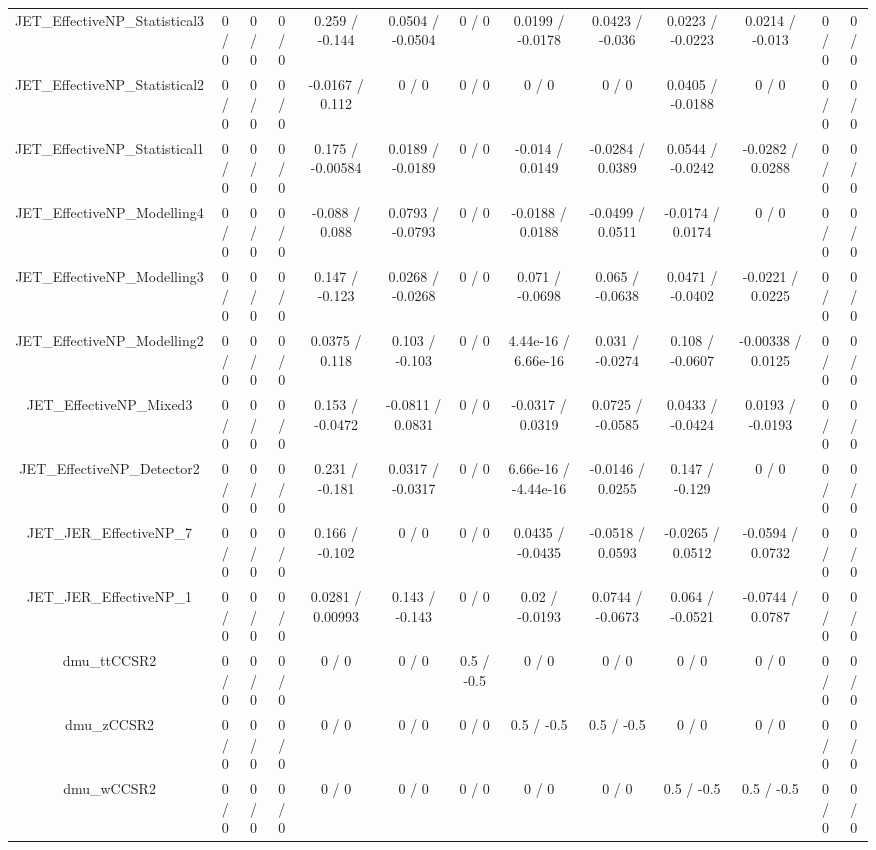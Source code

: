 \documentclass[10pt]{article}
\begin{document}
\begin{table}[htbp]
\begin{center}
\begin{tabular}{|c|c|c|c|c|c|c|c|c|c|c|c|c|}
  JET_EffectiveNP_Statistical3 & 0 / 0 & 0 / 0 & 0 / 0 & 0.259 / -0.144 & 0.0504 / -0.0504 & 0 / 0 & 0.0199 / -0.0178 & 0.0423 / -0.036 & 0.0223 / -0.0223 & 0.0214 / -0.013 & 0 / 0 & 0 / 0 \\ 
  JET_EffectiveNP_Statistical2 & 0 / 0 & 0 / 0 & 0 / 0 & -0.0167 / 0.112 & 0 / 0 & 0 / 0 & 0 / 0 & 0 / 0 & 0.0405 / -0.0188 & 0 / 0 & 0 / 0 & 0 / 0 \\ 
  JET_EffectiveNP_Statistical1 & 0 / 0 & 0 / 0 & 0 / 0 & 0.175 / -0.00584 & 0.0189 / -0.0189 & 0 / 0 & -0.014 / 0.0149 & -0.0284 / 0.0389 & 0.0544 / -0.0242 & -0.0282 / 0.0288 & 0 / 0 & 0 / 0 \\ 
  JET_EffectiveNP_Modelling4 & 0 / 0 & 0 / 0 & 0 / 0 & -0.088 / 0.088 & 0.0793 / -0.0793 & 0 / 0 & -0.0188 / 0.0188 & -0.0499 / 0.0511 & -0.0174 / 0.0174 & 0 / 0 & 0 / 0 & 0 / 0 \\ 
  JET_EffectiveNP_Modelling3 & 0 / 0 & 0 / 0 & 0 / 0 & 0.147 / -0.123 & 0.0268 / -0.0268 & 0 / 0 & 0.071 / -0.0698 & 0.065 / -0.0638 & 0.0471 / -0.0402 & -0.0221 / 0.0225 & 0 / 0 & 0 / 0 \\ 
  JET_EffectiveNP_Modelling2 & 0 / 0 & 0 / 0 & 0 / 0 & 0.0375 / 0.118 & 0.103 / -0.103 & 0 / 0 & 4.44e-16 / 6.66e-16 & 0.031 / -0.0274 & 0.108 / -0.0607 & -0.00338 / 0.0125 & 0 / 0 & 0 / 0 \\ 
  JET_EffectiveNP_Mixed3 & 0 / 0 & 0 / 0 & 0 / 0 & 0.153 / -0.0472 & -0.0811 / 0.0831 & 0 / 0 & -0.0317 / 0.0319 & 0.0725 / -0.0585 & 0.0433 / -0.0424 & 0.0193 / -0.0193 & 0 / 0 & 0 / 0 \\ 
  JET_EffectiveNP_Detector2 & 0 / 0 & 0 / 0 & 0 / 0 & 0.231 / -0.181 & 0.0317 / -0.0317 & 0 / 0 & 6.66e-16 / -4.44e-16 & -0.0146 / 0.0255 & 0.147 / -0.129 & 0 / 0 & 0 / 0 & 0 / 0 \\ 
  JET_JER_EffectiveNP_7 & 0 / 0 & 0 / 0 & 0 / 0 & 0.166 / -0.102 & 0 / 0 & 0 / 0 & 0.0435 / -0.0435 & -0.0518 / 0.0593 & -0.0265 / 0.0512 & -0.0594 / 0.0732 & 0 / 0 & 0 / 0 \\ 
  JET_JER_EffectiveNP_1 & 0 / 0 & 0 / 0 & 0 / 0 & 0.0281 / 0.00993 & 0.143 / -0.143 & 0 / 0 & 0.02 / -0.0193 & 0.0744 / -0.0673 & 0.064 / -0.0521 & -0.0744 / 0.0787 & 0 / 0 & 0 / 0 \\ 
  dmu_ttCCSR2 & 0 / 0 & 0 / 0 & 0 / 0 & 0 / 0 & 0 / 0 & 0.5 / -0.5 & 0 / 0 & 0 / 0 & 0 / 0 & 0 / 0 & 0 / 0 & 0 / 0 \\ 
  dmu_zCCSR2 & 0 / 0 & 0 / 0 & 0 / 0 & 0 / 0 & 0 / 0 & 0 / 0 & 0.5 / -0.5 & 0.5 / -0.5 & 0 / 0 & 0 / 0 & 0 / 0 & 0 / 0 \\ 
  dmu_wCCSR2 & 0 / 0 & 0 / 0 & 0 / 0 & 0 / 0 & 0 / 0 & 0 / 0 & 0 / 0 & 0 / 0 & 0.5 / -0.5 & 0.5 / -0.5 & 0 / 0 & 0 / 0 \\ 

\end{tabular}
\end{center}
\end{table}
\end{document}
